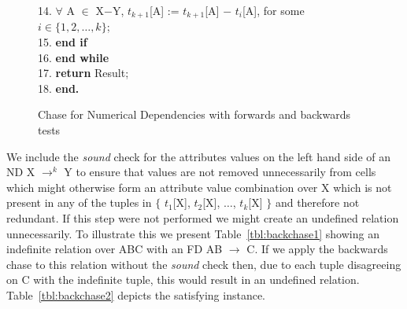 {\begin{figure}[ht]
{\begin{minipage}{14cm}
\begin{algorithm}[{\rm ND\_CHASE}($r$, {\rm N})]
\begin{rm}
\begin{tabbing}
14. \> \> \> \> \>  $\forall$ A $\in$ X$-$Y,  $t_{k+1}$[A] := $t_{k+1}$[A] $-$ $t_i$[A], for some $i \in \{1,2,\ldots,k\}$; \\
15. \> \> \> \> {\bf end if}\\
16.  \> \> \> {\bf end while} \\
17. \> \> \> {\bf return} Result;  \\
18. \> \> {\bf end.}
\end{tabbing}
\end{rm}
\end{algorithm}
\end{minipage}}
\caption{\label{cp:fig:indef_chase} Chase for Numerical Dependencies with forwards and backwards tests}
\end{figure}
}

We include the {\em sound} check for the attributes values on the left
hand side of an ND X $\to^k$ Y to ensure that values are not removed
unnecessarily 
from cells which might otherwise form an attribute value combination over X
which is not present in any of the tuples in $\{$ $t_1$[X], $t_2$[X],
$\ldots$, $t_k$[X] $\}$ and therefore not redundant. If this step were
not performed we might 
create an undefined relation unnecessarily. To illustrate this we
present Table~\ref{tbl:backchase1} showing an indefinite relation over
ABC with an FD AB $\to$ C. If we apply the backwards chase to this
relation without the {\em sound} check then, due to each tuple
disagreeing on C with the indefinite tuple, this would result in an undefined
relation. Table~\ref{tbl:backchase2} depicts the satisfying instance.

